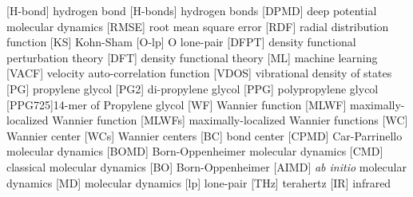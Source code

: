 


 \begin{acronym}[PPG725]
  \setlength{\itemsep}{4.0pt}
     [H-bond] {hydrogen bond} 
     [H-bonds] {hydrogen bonds} %
       [DPMD]   {deep potential molecular dynamics}
       [RMSE]   {root mean square error}
        [RDF]    {radial distribution function}
         [KS]    {Kohn-Sham} %
       [O-lp]  {O lone-pair} %
       [DFPT]  {density functional perturbation theory} %
        [DFT]   {density functional theory}
         [ML]    {machine learning}
       [VACF]  {velocity auto-correlation function}
       [VDOS]  {vibrational density of states}
         [PG]    {propylene glycol}
        [PG2]   {di-propylene glycol}
        [PPG]   {polypropylene glycol}
     [PPG725]{14-mer of Propylene glycol }
         [WF]    {Wannier function}
       [MLWF]  {maximally-localized Wannier function}
      [MLWFs]  {maximally-localized Wannier functions}
         [WC]    {Wannier center}
      [WCs]  {Wannier centers}
         [BC]    {bond center}
       [CPMD]  {Car-Parrinello molecular dynamics}
       [BOMD]  {Born-Oppenheimer molecular dynamics}
        [CMD]  {classical molecular dynamics}
         [BO]    {Born-Oppenheimer}
       [AIMD]  {\textit{ab initio} molecular dynamics}
         [MD]    {molecular dynamics}
         [lp]    {lone-pair}   
        [THz]    {terahertz}
         [IR]     {infrared}

 \end{acronym}